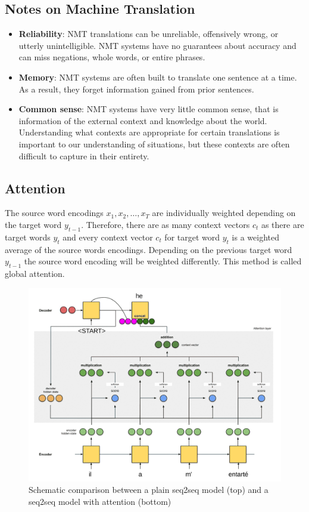 \documentclass[11pt]{article}
\begin{document}
\subsection{Notes on Machine Translation}
\begin{itemize}
	\item \textbf{Reliability}: NMT translations can be unreliable, offensively wrong, or utterly unintelligible. NMT systems have no guarantees about accuracy and can miss negations, whole words, or entire phrases.
	\item \textbf{Memory}: NMT systems are often built to translate one sentence at a time. As a result, they forget information gained from prior sentences.
	\item \textbf{Common sense}: NMT systems have very little common sense, that is information of the external context and knowledge about the world. Understanding what contexts are appropriate for certain translations is important to our understanding of situations, but these contexts are often difficult to capture in their entirety.
\end{itemize}

\subsection{Attention}
\begin{minipage}{0.65\linewidth}
	The source word encodings $x_1,x_2, \dots, x_T$ are individually weighted depending on the target word $y_{t-1}$. Therefore, there are as many context vectors $c_t$ as there are target words $y_t$ and every context vector $c_t$ for target word $y_t$ is a weighted average of the source words encodings. Depending on the previous target word $y_{t-1}$ the source word encoding will be weighted differently. This method is called global attention.
\end{minipage}
\begin{minipage}{0.3\linewidth}
\begin{figure}[H]
	\includegraphics[width=\linewidth]{img/seq2seq_attention}
	\caption{Schematic comparison between a plain seq2seq model (top) and a seq2seq model with attention (bottom)}
	\label{fig:seq2seqattention}
\end{figure}
\end{minipage}
\end{document}
